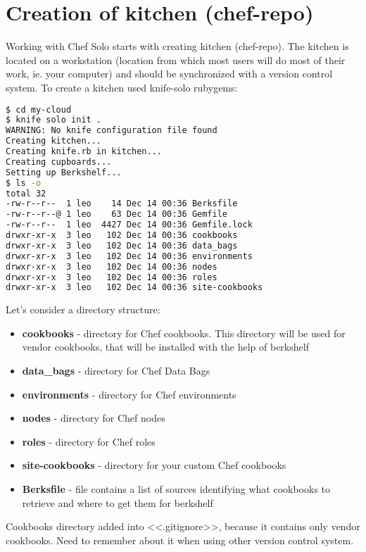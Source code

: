 \section{Creation of kitchen (chef-repo)}

Working with Chef Solo starts with creating kitchen (chef-repo). The kitchen is located on a workstation (location from which most users will do most of their work, ie. your computer) and should be synchronized with a version control system. To create a kitchen used knife-solo rubygems:

\begin{lstlisting}[language=Bash,label=lst:my-cloud-kitchen1,title=my-cloud]
$ cd my-cloud
$ knife solo init .
WARNING: No knife configuration file found
Creating kitchen...
Creating knife.rb in kitchen...
Creating cupboards...
Setting up Berkshelf...
$ ls -o
total 32
-rw-r--r--  1 leo    14 Dec 14 00:36 Berksfile
-rw-r--r--@ 1 leo    63 Dec 14 00:36 Gemfile
-rw-r--r--  1 leo  4427 Dec 14 00:36 Gemfile.lock
drwxr-xr-x  3 leo   102 Dec 14 00:36 cookbooks
drwxr-xr-x  3 leo   102 Dec 14 00:36 data_bags
drwxr-xr-x  3 leo   102 Dec 14 00:36 environments
drwxr-xr-x  3 leo   102 Dec 14 00:36 nodes
drwxr-xr-x  3 leo   102 Dec 14 00:36 roles
drwxr-xr-x  3 leo   102 Dec 14 00:36 site-cookbooks
\end{lstlisting}

Let's consider a directory structure:

\begin{itemize}
  \item \textbf{cookbooks} - directory for Chef cookbooks. This directory will be used for vendor cookbooks, that will be installed with the help of berkshelf
  \item \textbf{data\_bags} - directory for Chef Data Bags
  \item \textbf{environments} - directory for Chef environments
  \item \textbf{nodes} - directory for Chef nodes
  \item \textbf{roles} - directory for Chef roles
  \item \textbf{site-cookbooks} - directory for your custom Chef cookbooks
  \item \textbf{Berksfile} - file contains a list of sources identifying what cookbooks to retrieve and where to get them for berkshelf
\end{itemize}

Cookbooks directory added into <<.gitignore>>, because it contains only vendor cookbooks. Need to remember about it when using other version control system.

